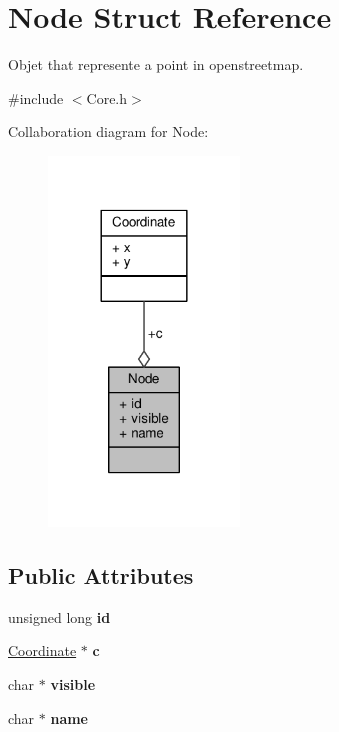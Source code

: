 \hypertarget{structNode}{\section{Node Struct Reference}
\label{structNode}
}


Objet that represente a point in openstreetmap.  




{\ttfamily \#include $<$Core.\-h$>$}



Collaboration diagram for Node\-:
\nopagebreak
\begin{figure}[H]
\begin{center}
\leavevmode
\includegraphics[width=144pt]{structNode__coll__graph}
\end{center}
\end{figure}
\subsection*{Public Attributes}
\begin{DoxyCompactItemize}
\item 
\hypertarget{structNode_aa8fa6b7f98e29166dbccce4a7f09929c}{unsigned long {\bfseries id}}\label{structNode_aa8fa6b7f98e29166dbccce4a7f09929c}

\item 
\hypertarget{structNode_a26b699d982158ab6f00cff23b1e13d4b}{\hyperlink{structCoordinate}{Coordinate} $\ast$ {\bfseries c}}\label{structNode_a26b699d982158ab6f00cff23b1e13d4b}

\item 
\hypertarget{structNode_a028bca5291cb35567d02b8077a81efdb}{char $\ast$ {\bfseries visible}}\label{structNode_a028bca5291cb35567d02b8077a81efdb}

\item 
\hypertarget{structNode_a059a0ea6f86dce9fd919c08a707b360b}{char $\ast$ {\bfseries name}}\label{structNode_a059a0ea6f86dce9fd919c08a707b360b}

\end{DoxyCompactItemize}


